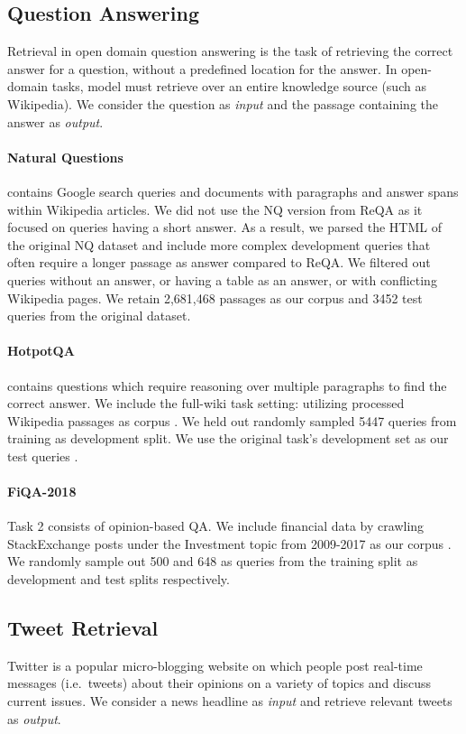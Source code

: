 \documentclass[11pt]{article}
\begin{document}
\subsection{Question Answering}

Retrieval in open domain question answering \cite{chen-etal-2017-reading} is the task of retrieving the correct answer for a question, without a predefined location for the answer. In open-domain tasks, model must retrieve over an entire knowledge source (such as Wikipedia). We consider the question as \textit{input} and the passage containing the answer as \textit{output}.

\paragraph{Natural Questions} \cite{47761} contains Google search queries and documents with paragraphs and answer spans within Wikipedia articles. We did not use the NQ version from ReQA \cite{ahmad-etal-2019-reqa} as it focused on queries having a short answer. As a result, we parsed the HTML of the original NQ dataset and include more complex development queries that often require a longer passage as answer compared to ReQA. We filtered out queries without an answer, or having a table as an answer, or with conflicting Wikipedia pages. We retain 2,681,468 passages as our corpus  and 3452 test queries  from the original dataset.

\paragraph{HotpotQA} \cite{yang-etal-2018-hotpotqa} contains questions which require reasoning over multiple paragraphs to find the correct answer. We include the full-wiki task setting: utilizing processed Wikipedia passages as corpus . We held out randomly sampled 5447 queries from training as development split. We use the original task's development set as our test queries .

 \paragraph{FiQA-2018} \cite{10.1145/3184558.3192301} Task 2 consists of opinion-based QA. We include financial data by crawling StackExchange posts under the Investment topic from 2009-2017 as our corpus . We randomly sample out 500 and 648 as queries  from the training split as development and test splits respectively.

\subsection{Tweet Retrieval}
Twitter is a popular micro-blogging website on which people post real-time messages (i.e.\ tweets) about their opinions on a variety of topics and discuss current issues. We consider a news headline as \textit{input} and retrieve relevant tweets as \textit{output}.
\end{document}
